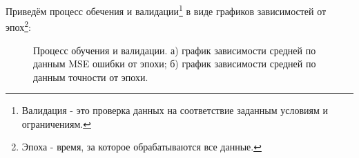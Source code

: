 \documentclass[a4paper,11pt]{article} %
\begin{document}
Приведём процесс  обечения и  валидации\footnote{Валидация - это проверка данных на соответствие заданным условиям и ограничениям.} в виде графиков  зависимостей  от эпох\footnote{Эпоха - время, за которое обрабатываются все данные.}:
\begin{figure}[h]
\begin{minipage}[h]{0.49\linewidth}
\end{minipage}
\hfill
\begin{minipage}[h]{0.49\linewidth}
\end{minipage}
\caption{Процесс обучения и валидации. а) график зависимости средней по данным MSE ошибки от эпохи; б) график зависимости средней по данным точности от эпохи.}
\label{train}
\end{figure}
\end{document}
